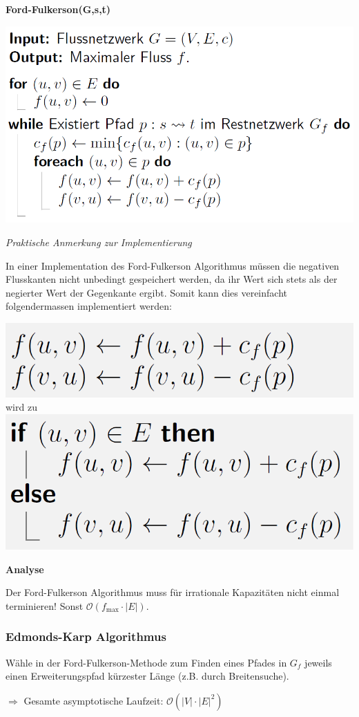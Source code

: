 \begin{sectionbox}
\textbf{Ford-Fulkerson(G,s,t)}\par
\includegraphics[width = 0.8\columnwidth]{../img/FoFu.png}\par\smallskip

\textit{Praktische Anmerkung zur Implementierung}\par
In einer Implementation des Ford-Fulkerson Algorithmus müssen die negativen Flusskanten nicht unbedingt gespeichert werden, da ihr Wert sich stets als der negierter Wert der Gegenkante ergibt. Somit kann dies vereinfacht folgendermassen implementiert werden:\par\smallskip
\includegraphics[width = 0.45\columnwidth]{../img/paFF1.png} wird zu
\includegraphics[width = 0.4\columnwidth]{../img/paFF2.png}\par\smallskip

\textbf{Analyse}\par
Der Ford-Fulkerson Algorithmus muss für irrationale Kapazitäten nicht einmal terminieren! Sonst $\mathcal{O}\left(f_{\max }\cdot |E|\right)$.\vspace{10px}

\subsubsection{Edmonds-Karp Algorithmus}\smallskip
Wähle in der Ford-Fulkerson-Methode zum Finden eines Pfades in $G_{f}$ jeweils einen Erweiterungspfad kürzester Länge (z.B. durch Breitensuche).\par $\Rightarrow$ Gesamte asymptotische Laufzeit: $\mathcal{O}\left(|V| \cdot|E|^{2}\right)$

\end{sectionbox}

